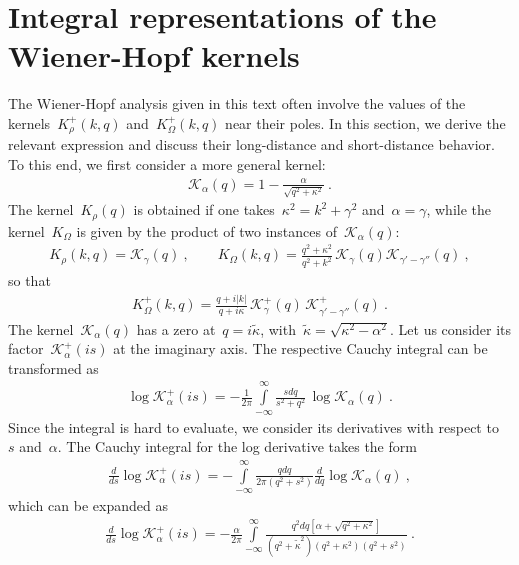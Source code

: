 \documentclass[preprint,aps,eqsecnum, prb]{revtex4-1}
\newcommand{\fplus}[1]{{#1}^{+}}
\begin{document}
\section{Integral representations of the Wiener-Hopf kernels}

The Wiener-Hopf analysis given in this text often involve the
values of the kernels~$\fplus{K}_\rho(k, q)$ and~$\fplus{K}_\Omega(k, q)$ near
their poles. In this section, we derive the relevant expression
and discuss their long-distance and short-distance behavior.
To this end, we first consider a more general kernel:
\begin{align}
  \mathcal{K}_\alpha(q) = 1 - \frac{\alpha}{\sqrt{q^2 + \kappa^2}}\ .
\end{align}
The kernel~$K_\rho(q)$ is obtained if one takes~$\kappa^2 = k^2 + \gamma^2$
and~$\alpha = \gamma$, while the kernel~$K_\Omega$ is given by
the product of two instances of~$\mathcal{K}_\alpha(q)$:
\begin{align}
  \label{eq:appA-representation}
  K_\rho(k, q) = \mathcal{K}_\gamma(q)\ , \qquad
  K_\Omega(k, q) = \frac{q^2 + \kappa^2}{q^2 + k^2}\,
 \mathcal{K}_{\gamma}(q) \mathcal{K}_{\gamma' - \gamma''}(q)\ ,
\end{align}
so that
\begin{align}
  \fplus{K}_\Omega(k, q) = \frac{q + i|k|}{q + i \kappa}\,
  \fplus{\mathcal{K}}_\gamma(q)\,
  \fplus{\mathcal{K}}_{\gamma' - \gamma''}(q)\ .
\end{align}
The kernel~$\mathcal{K}_\alpha(q)$ has a zero at~$q = i {\tilde \kappa}$,
with~${\tilde \kappa} = \sqrt{\kappa^2 - \alpha^2}$.
Let us consider its factor~$\fplus{\mathcal{K}}_\alpha(is)$
at the imaginary axis.
The respective Cauchy integral can be transformed as
\begin{align}
  \log \fplus{\mathcal{K}}_{\alpha}(is) = - \frac{1}{2\pi}
  \int\limits_{-\infty}^{\infty}
  \frac{s dq}{s^2 + q^2} \, \log \mathcal{K}_{\alpha}(q)\ .
\end{align}
Since the integral is hard to evaluate, we consider its derivatives
with respect to~$s$ and~$\alpha$.
The Cauchy integral for the log derivative takes the form
\begin{align}
  \frac{d}{ds} \log \fplus{\mathcal{K}}_{\alpha}(is)
  = -\int\limits_{-\infty}^{\infty} \frac{qdq}{2\pi (q^2 + s^2)}
  \frac{d}{dq} \log \mathcal{K}_\alpha(q)\ ,
\end{align}
which can be expanded as
\begin{align}
  \frac{d}{ds} \log \fplus{\mathcal{K}}_{\alpha}(is)
  = - \frac{\alpha}{2\pi}
  \int\limits_{-\infty}^{\infty}
  \frac{q^2 dq \left[\alpha + \sqrt{q^2 + \kappa^2}\right]}{
     (q^2 + {\tilde \kappa}^2) (q^2 + \kappa^2) (q^2 + s^2)
  }\ .
\end{align}
\end{document}
